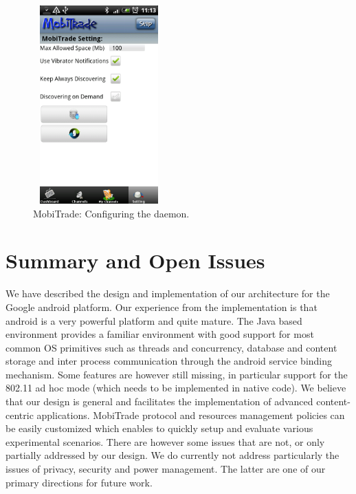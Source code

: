 \begin{figure}[!h]
\begin{center}
\includegraphics[width=2in,height=3in]{Chapitre6/Config.png}
\end{center}
\caption{MobiTrade: Configuring the daemon.}
\label{Config}
\end{figure}

\section{Summary and Open Issues}
\label{MobiTradeSoftSummary}

We have described the design and implementation of our architecture for the Google android platform. Our experience from the implementation is that android is a very powerful platform and quite mature. The Java based environment provides a familiar environment with good support for most common OS primitives such as threads and concurrency, database and content storage and inter process communication through the android service binding mechanism. Some features are however still missing, in particular support for the 802.11 ad hoc mode (which needs to be implemented in native code). We believe that our design is general and facilitates the implementation of 
advanced content-centric applications. MobiTrade protocol and resources management policies can be easily customized which enables to quickly setup and evaluate various experimental scenarios. There are however some issues that are not, or only partially addressed by our design. We do currently not address particularly the issues of privacy, security and power management. The latter are one of our primary directions for future work. 
